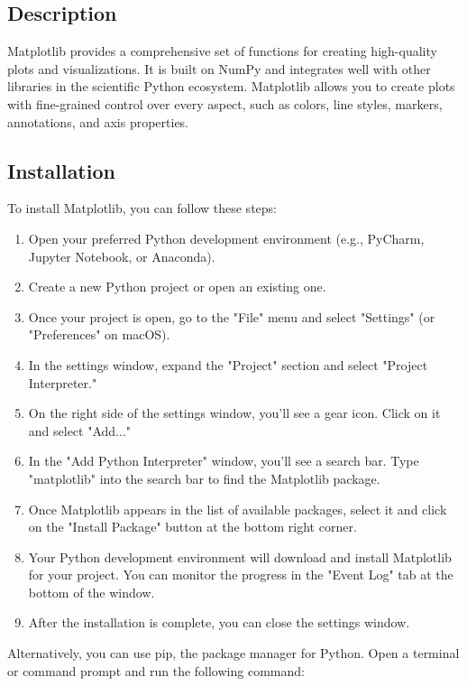 \subsection{Description}

Matplotlib provides a comprehensive set of functions for creating high-quality plots and visualizations. It is built on NumPy and integrates well with other libraries in the scientific Python ecosystem. Matplotlib allows you to create plots with fine-grained control over every aspect, such as colors, line styles, markers, annotations, and axis properties.

\subsection{Installation}

To install Matplotlib, you can follow these steps:

\begin{enumerate}
	\item Open your preferred Python development environment (e.g., PyCharm, Jupyter Notebook, or Anaconda).
	\item Create a new Python project or open an existing one.
	\item Once your project is open, go to the "File" menu and select "Settings" (or "Preferences" on macOS).
	\item In the settings window, expand the "Project" section and select "Project Interpreter."
	\item On the right side of the settings window, you'll see a gear icon. Click on it and select "Add..."
	\item In the "Add Python Interpreter" window, you'll see a search bar. Type "matplotlib" into the search bar to find the Matplotlib package.
	\item Once Matplotlib appears in the list of available packages, select it and click on the "Install Package" button at the bottom right corner.
	\item Your Python development environment will download and install Matplotlib for your project. You can monitor the progress in the "Event Log" tab at the bottom of the window.
	\item After the installation is complete, you can close the settings window.
\end{enumerate}

Alternatively, you can use pip, the package manager for Python. Open a terminal or command prompt and run the following command:

